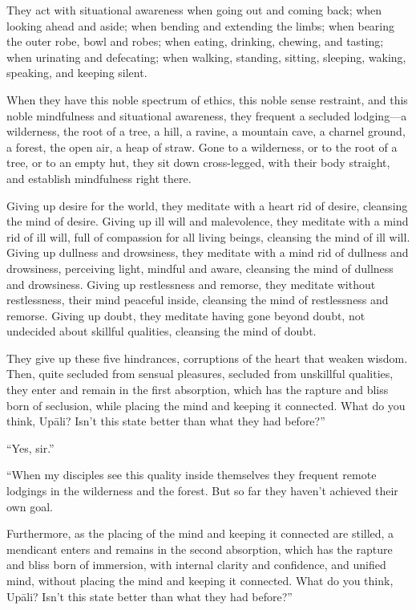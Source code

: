 \documentclass[12pt,openany]{book}%
\begin{document}
They act with situational awareness when going out and coming back; when looking ahead and aside; when bending and extending the limbs; when bearing the outer robe, bowl and robes; when eating, drinking, chewing, and tasting; when urinating and defecating; when walking, standing, sitting, sleeping, waking, speaking, and keeping silent. 

When they have this noble spectrum of ethics, this noble sense restraint, and this noble mindfulness and situational awareness, they frequent a secluded lodging—a wilderness, the root of a tree, a hill, a ravine, a mountain cave, a charnel ground, a forest, the open air, a heap of straw. Gone to a wilderness, or to the root of a tree, or to an empty hut, they sit down cross-legged, with their body straight, and establish mindfulness right there. 

Giving up desire for the world, they meditate with a heart rid of desire, cleansing the mind of desire. Giving up ill will and malevolence, they meditate with a mind rid of ill will, full of compassion for all living beings, cleansing the mind of ill will. Giving up dullness and drowsiness, they meditate with a mind rid of dullness and drowsiness, perceiving light, mindful and aware, cleansing the mind of dullness and drowsiness. Giving up restlessness and remorse, they meditate without restlessness, their mind peaceful inside, cleansing the mind of restlessness and remorse. Giving up doubt, they meditate having gone beyond doubt, not undecided about skillful qualities, cleansing the mind of doubt. 

They give up these five hindrances, corruptions of the heart that weaken wisdom. Then, quite secluded from sensual pleasures, secluded from unskillful qualities, they enter and remain in the first absorption, which has the rapture and bliss born of seclusion, while placing the mind and keeping it connected. What do you think, \textsanskrit{Upāli}? Isn’t this state better than what they had before?” 

“Yes, sir.” 

“When my disciples see this quality inside themselves they frequent remote lodgings in the wilderness and the forest. But so far they haven’t achieved their own goal. 

Furthermore, as the placing of the mind and keeping it connected are stilled, a mendicant enters and remains in the second absorption, which has the rapture and bliss born of immersion, with internal clarity and confidence, and unified mind, without placing the mind and keeping it connected. What do you think, \textsanskrit{Upāli}? Isn’t this state better than what they had before?” 
\end{document}
